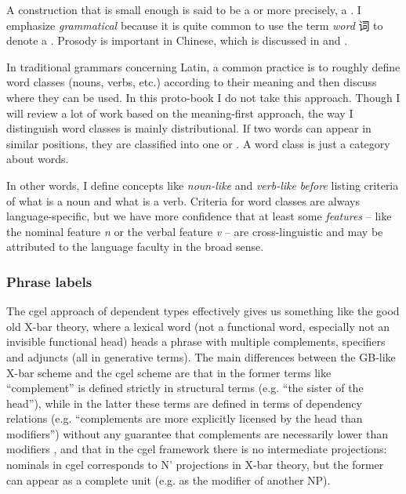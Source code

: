 \documentclass[../main.tex]{subfiles}
\begin{document}
A construction that is small enough is said to be a  or more precisely, 
a .
I emphasize \emph{grammatical} because it is quite common to use the term \emph{word} 词 to denote 
a . Prosody is important in Chinese, which is discussed in 
 and . 

In traditional grammars concerning Latin, a common practice is to roughly define word classes (nouns, verbs, etc.) 
according to their meaning and then discuss where they can be used. 
In this proto-book I do not take this approach. Though I will review a lot of work based on the meaning-first 
approach, the way I distinguish word classes is mainly distributional. If two words can appear in similar
positions, they are classified into one  or .
A word class is just a category about words.  

In other words, I define concepts like \emph{noun-like} and \emph{verb-like} \emph{before} listing criteria of 
what is a noun and what is a verb. Criteria for word classes are always language-specific, but we have more 
confidence that at least some \emph{features} -- like the nominal feature \textit{n} or the verbal feature 
\textit{v} -- are cross-linguistic and may be attributed to the language faculty in the broad sense. 

\subsubsection{Phrase labels}\label{sec:phrase-label}


The \ac{cgel} approach of dependent types effectively gives us something like the good old X-bar theory, where a lexical word 
(not a functional word, especially not an invisible functional head) heads a phrase with multiple 
complements, specifiers and adjuncts (all in generative terms). The main differences between the GB-like 
X-bar scheme and the \ac{cgel} scheme are that in the former terms like ``complement'' is defined strictly 
in structural terms (e.g. ``the sister of the head''), while in the latter these terms are defined in 
terms of dependency relations (e.g. ``complements are more explicitly licensed by the head than 
modifiers'') without any guarantee that complements are necessarily lower than modifiers \citep{payne2007fusion},
and that in the \ac{cgel} framework there is no intermediate projections: nominals in \ac{cgel} corresponds 
to N' projections in X-bar theory, but the former can appear as a complete unit (e.g. as the modifier of another 
NP). 
\end{document}
